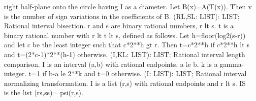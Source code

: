 right half-plane onto the circle having I as a diameter.
Let B(x)=A(T(x)).  Then v is the number of sign variations in the
coefficients of B. \ecom 
{} (RL,SL: LIST): LIST; \eproc
\bcom Rational interval bisection. r and s are binary rational numbers,
r lt s.  t is a binary rational number with r lt t lt s, defined
as follows.  Let h=floor(log2(s-r)) and let c be the least integer
such that c*2**h gt r.  Then t=c*2**h if c*2**h lt s and
t=(2*c-1)*2**(h-1) otherwise. \ecom 
{} (I,KL: LIST): LIST; \eproc
\bcom Rational interval length comparison. I is an interval (a,b) with
rational endpoints, a le b.  k is a gamma-integer.  t=1 if b-a le
2**k and t=0 otherwise. \ecom 
{} (I: LIST): LIST; \eproc
\bcom Rational interval normalizing transformation. I is a list (r,s)
with rational endpoints and r lt s.  IS is the list (rs,ss)=
psi(r,s). \ecom 
